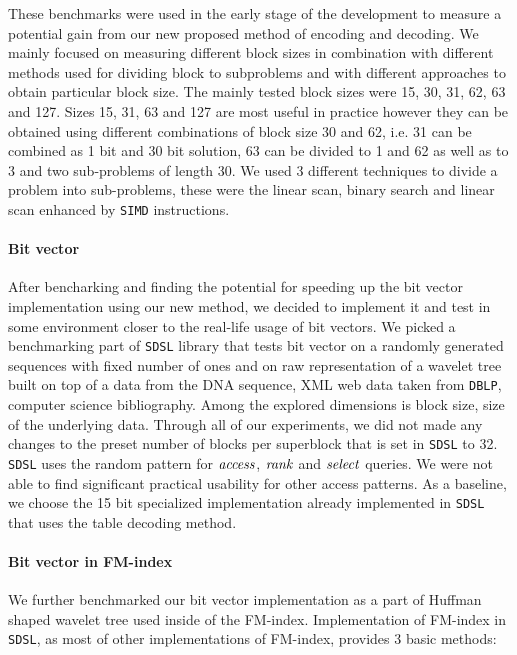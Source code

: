 These benchmarks were used in the early stage of the development to measure a potential gain from
our new proposed method of encoding and decoding. We mainly focused on measuring different block sizes
in combination with different methods used for dividing block to subproblems and with different
approaches to obtain particular block size. The mainly tested block sizes were 15, 30, 31, 62, 63
and 127. Sizes 15, 31, 63 and 127 are most useful in practice however they can be obtained using
different combinations of block size 30 and 62, i.e. 31 can be combined as 1 bit and 30 bit solution,
63 can be divided to 1 and 62 as well as to 3 and two sub-problems of length 30.
We used 3 different techniques to divide a problem into sub-problems, these were the linear scan,
binary search and linear scan enhanced by \texttt{SIMD} instructions.

\paragraph{Bit vector}

After bencharking and finding the potential for speeding up the bit vector implementation using
our new method, we decided to implement it and test in some environment closer to the real-life
usage of bit vectors. We picked a benchmarking part of \texttt{SDSL} library that tests bit vector
on a randomly generated sequences with fixed number of ones and on raw representation of a wavelet
tree built on top of a data from the DNA sequence, XML web data taken from \texttt{DBLP}, computer
science bibliography. Among the explored dimensions is block size, size of the underlying data.
Through all of our experiments, we did not made any changes to the preset number of blocks per
superblock that is set in \texttt{SDSL} to 32. \texttt{SDSL} uses the random pattern for $\mathit{access}$,
$\mathit{rank}$ and $\mathit{select}$ queries. We were not able to find significant practical usability for other
access patterns. As a baseline, we choose the 15 bit specialized implementation already implemented
in \texttt{SDSL} that uses the table decoding method.

\paragraph{Bit vector in FM-index}

We further benchmarked our bit vector implementation as a part of Huffman shaped wavelet tree
used inside of the FM-index. Implementation of FM-index in \texttt{SDSL}, as most of other
implementations of FM-index, provides 3 basic methods:

